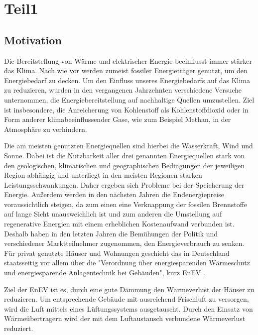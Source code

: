 \chapter{Teil1}
\label{cha:Einleitung}

\section{Motivation}
\label{sec:Motivation}

Die Bereitstellung von Wärme und elektrischer Energie beeinflusst immer stärker das Klima. Nach wie vor werden zumeist fossiler Energieträger genutzt, um den Energiebedarf zu decken. Um den Einfluss unseres Energiebedarfs auf das Klima zu reduzieren, wurden in den vergangenen Jahrzehnten verschiedene Versuche unternommen, die Energiebereitstellung auf nachhaltige Quellen umzustellen. Ziel ist insbesondere, die Anreicherung von Kohlenstoff als Kohlenstoffdioxid oder in Form anderer klimabeeinflussender Gase, wie zum Beispiel Methan, in der Atmosphäre zu verhindern. 

Die am meisten genutzten Energiequellen sind hierbei die Wasserkraft, Wind und Sonne. Dabei ist die Nutzbarkeit aller drei genannten Energiequellen stark von den geologischen, klimatischen und geographischen Bedingungen der jeweiligen Region abhängig und unterliegt in den meisten Regionen starken Leistungsschwankungen. Daher ergeben sich Probleme bei der Speicherung der Energie. Außerdem werden in den nächsten Jahren die Endenergiepreise voraussichtlich steigen, da zum einen eine Verknappung der fossilen Brennstoffe auf lange Sicht unausweichlich ist und zum anderen die Umstellung auf regenerative Energien mit einem erheblichen Kostenaufwand verbunden ist.  Deshalb haben in den letzten Jahren die Bemühungen der Politik und verschiedener Marktteilnehmer zugenommen, den Energieverbrauch zu senken. Für privat genutzte Häuser und Wohnungen geschieht das in Deutschland staatsseitig vor allem über die "Verordnung über energiesparenden Wärmeschutz und energiesparende Anlagentechnik bei Gebäuden", kurz EnEV \cite{.28.10.2015}. %

Ziel der EnEV ist es, durch eine gute Dämmung den Wärmeverlust der Häuser zu reduzieren. Um entsprechende Gebäude mit ausreichend Frischluft zu versorgen, wird die Luft mittels eines Lüftungssystems ausgetauscht. Durch den Einsatz von Wärmeübertragern wird der mit dem Luftaustausch verbundene Wärmeverlust reduziert. 

